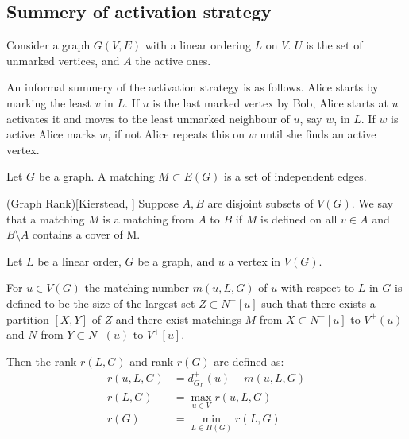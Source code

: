 \subsection{Summery of activation strategy}

Consider a graph $G(V,E)$ with a linear ordering $L$ on $V$. $U$ is the set of unmarked vertices, and $A$ the active ones.

An informal summery of the activation strategy is as follows. Alice starts by marking the least $v$ in $L$. If $u$ is the last marked vertex by Bob, Alice starts at $u$ activates it and moves to the least unmarked neighbour of $u$, say $w$, in $L$. If $w$ is active Alice marks $w$, if not Alice repeats this on $w$ until she finds an active vertex.


\begin{definition}[Matching]
    Let $G$ be a graph. A matching $M\subset E(G)$ is a set of independent edges.
\end{definition}

\begin{definition}(Graph Rank)[Kierstead, \cite{KIERSTEAD2000}] \label{defnRank}
    Suppose $A,B$ are disjoint subsets of $V(G)$. We say that a matching $M$ is a matching from $A$ to $B$ if $M$ is defined on all $v\in A$ and $B\setminus A$ contains a cover of M. 
    
    Let $L$ be a linear order, $G$ be a graph, and $u$ a vertex in $V(G)$.
        
    For $u \in V(G)$ the matching number $m(u, L, G)$ of $u$ with respect to $L$ in $G$ is defined to be the size of the largest set $Z \subset N^-[u]$ such that there exists a partition $[X, Y]$ of $Z$ and there exist matchings $M$ from
    $X\subset N^-[u]$ to $V^+(u)$ and $N$ from $Y\subset N^-(u)$ to $V^+[u]$.
    
    Then the rank $r(L,G)$ and rank $r(G)$ are defined as:
    \begin{align*}
    	r(u,L,G) & = d^+_{G_L}(u) + m(u,L,G) \\
    	r(L,G)   & = \max_{u \in V}r(u,L,G)  \\
    	r(G)     & = \min_{L \in \Pi(G)} r(L,G)
    \end{align*}
\end{definition}


